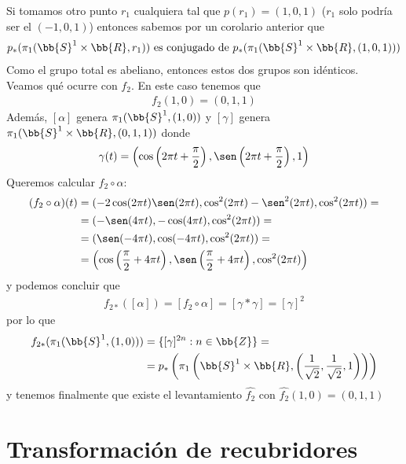 \begin{ejemplo}
    Si tomamos otro punto $r_1$ cualquiera tal que $p(r_1)=(1,0,1)$ ($r_1$ solo podría ser el $(-1,0,1)$) entonces sabemos por un corolario anterior que 
    \begin{gather*}
        p_*(\pi_1(\bb{S}^1\times \bb{R}, r_1)) \text{ es conjugado de } p_*(\pi_1(\bb{S}^1 \times \bb{R}, (1,0,1)))
    \end{gather*}
    Como el grupo total es abeliano, entonces estos dos grupos son idénticos.\\
    
    Veamos qué ocurre con $f_2$. En este caso tenemos que 
    \begin{gather*}
        f_2(1,0) = (0,1,1)
    \end{gather*}
    Además, $[\alpha]$ genera $\pi_1(\bb{S}^1, (1,0))$ y $[\gamma]$ genera $\pi_1(\bb{S}^1 \times \bb{R}, (0,1,1))$ donde 
    \begin{gather*}
        \gamma(t) = \left(\cos\left(2\pi t + \frac{\pi}{2}\right), \sen\left(2\pi t + \frac{\pi}{2}\right), 1\right)
    \end{gather*}
    Queremos calcular $f_2\circ \alpha$:
    \begin{align*}
        (f_2\circ \alpha)(t) &= (-2\cos(2\pi t)\sen(2\pi t), \cos^2(2\pi t) - \sen^2(2\pi t), \cos^2(2\pi t)) = \\
        &= (-\sen(4\pi t), -\cos(4\pi t), \cos^2(2\pi t)) =\\
        &= (\sen(-4\pi t), \cos(-4\pi t), \cos^2(2\pi t)) =\\
        &= \left(\cos\left(\frac{\pi}{2} + 4\pi t\right), \sen\left(\frac{\pi}{2} + 4\pi t\right), \cos^2(2\pi t)\right)
    \end{align*}
    y podemos concluir que 
    \begin{gather*}
        f_{2*}([\alpha]) = [f_2\circ \alpha] = [\gamma \ast \gamma] = [\gamma]^2
    \end{gather*}
    por lo que
    \begin{align*}
        f_{2*}(\pi_1(\bb{S}^1,(1,0))) &= \{[\gamma]^{2n} : n\in \bb{Z}\} =\\
        &= p_*\left(\pi_1\left(\bb{S}^1 \times \bb{R}, \left(\frac{1}{\sqrt{2}}, \frac{1}{\sqrt{2}}, 1\right)\right) \right) 
    \end{align*}
    y tenemos finalmente que existe el levantamiento $\hat{f_2}$ con $\hat{f_2}(1,0)=(0,1,1)$
\end{ejemplo}

\section{Transformación de recubridores}

